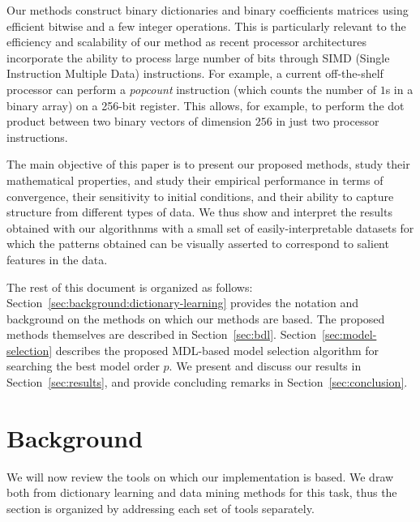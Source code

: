 \documentclass[twocolumn]{IEEEtran}
\theoremstyle{definition}
\begin{document}
Our methods construct binary dictionaries and binary coefficients matrices using efficient bitwise and a few integer operations. This is particularly relevant to the efficiency and scalability of our method as recent processor architectures incorporate the ability to process large number of bits through SIMD (Single Instruction Multiple Data) instructions. For example, a current off-the-shelf processor can perform a \emph{popcount} instruction (which counts the number of $1$s in a binary array) on a 256-bit register. This allows, for example, to perform the dot product between two binary vectors of dimension $256$ in just two processor instructions. 

The main objective of this paper is to present our proposed methods, study their mathematical properties, and study their empirical performance in terms of convergence, their sensitivity to initial conditions, and their ability to capture structure from different types of data. We thus show and interpret the results obtained with our algorithnms with a small set of easily-interpretable datasets for which the patterns obtained can be visually asserted to correspond to salient features in the data.

The rest of this document is organized as follows: Section~\ref{sec:background:dictionary-learning} provides the notation and background on the methods on which our methods are based. The proposed methods themselves are described in Section~\ref{sec:bdl}.
Section~\ref{sec:model-selection} describes the proposed MDL-based model selection algorithm for searching the best model order $p$. %
We present and discuss our results in Section~\ref{sec:results}, and provide concluding remarks in Section~\ref{sec:conclusion}.

\section{Background}
\label{sec:background}
%
%
\def\indicator{\mathbf{1}}
\def\bool{\mathrm{bool}}
\def\bprod{\circ}
\def\bsum{\lor}
\def\bigand{\bigwedge}
\def\bigor{\bigvee}
\def\msum{\oplus}
\def\mprod{\otimes}
\def\mod{\mathrm{mod}}
\newcommand{\iter}[1]{^{(#1)}}
\newcommand{\st}{\ensuremath{\quad\mathrm{s.t.}\quad}}
\newcommand{\norm}[1]{\ensuremath{\left\|#1\right\|}}
\newcommand{\support}[1]{\mathrm{supp}(#1)}
\newcommand{\rankf}[1]{\mathrm{rank}(#1)}
\def\rank{\mathrm{rank}}
\newcommand{\fun}[1]{\mathrm{#1}}
\newcommand{\abs}[1]{\ensuremath{\left|#1\right|}}
\newcommand{\setdef}[1]{\ensuremath{\left\{#1\right\}}}
\newcommand{\setspan}{\ensuremath{\mathrm{span}}}
\newcommand{\svec}[1]{_{[#1]}}
\newcommand{\col}[1]{_{#1}}
\newcommand{\row}[1]{^{#1}}
\newcommand{\havg}[1]{\langle\!\langle{#1}\rangle\!\rangle}
%
We will now review the tools on which our implementation is based. We draw both from dictionary learning and data mining methods for this task, thus the section is organized by addressing each set of tools separately. 
\end{document}
